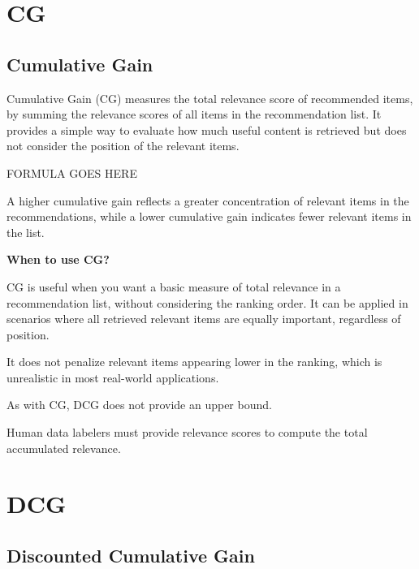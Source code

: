 \clearpage
\thispagestyle{rankingstyle}
\section{CG}
\subsection{Cumulative Gain}

Cumulative Gain (CG) measures the total relevance score of recommended items, by summing the relevance scores of all
items in the recommendation list. It provides a simple way to evaluate how much useful content is retrieved but
does not consider the position of the relevant items.

\begin{center}
    FORMULA GOES HERE
\end{center}

A higher cumulative gain reflects a greater concentration of relevant items in the recommendations,
while a lower cumulative gain indicates fewer relevant items in the list.

\textbf{When to use CG?}

CG is useful when you want a basic measure of total relevance in a recommendation list, without considering the ranking order.
It can be applied in scenarios where all retrieved relevant items are equally important, regardless of position.


{
    \item It does not penalize relevant items appearing lower in the ranking, which is
    unrealistic in most real-world applications.
    \item As with CG, DCG does not provide an upper bound.
    \item Human data labelers must provide relevance scores to compute the total accumulated relevance.
}


\clearpage
\thispagestyle{rankingstyle}
\section{DCG}
\subsection{Discounted Cumulative Gain}

